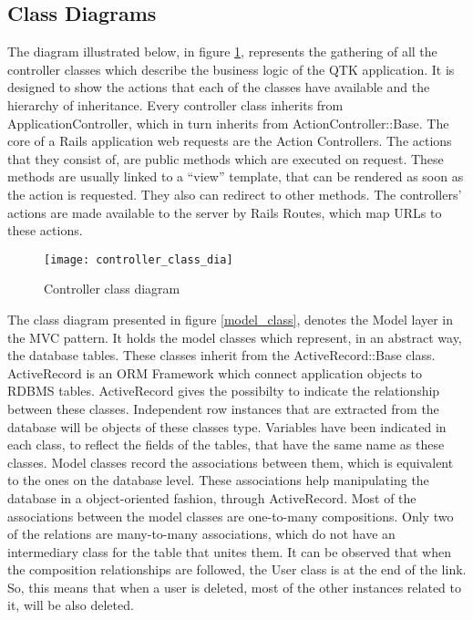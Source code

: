 \subsection{Class Diagrams}

The diagram illustrated below, in figure \ref{controller_class}, represents the gathering of all the controller classes which describe the business logic of the QTK application. It is designed to show the actions that each of the classes have available and the hierarchy of inheritance. Every controller class inherits from ApplicationController, which in turn inherits from ActionController::Base. The core of a Rails application web requests are the Action Controllers. The actions that they consist of, are public methods which are executed on request. These methods are usually linked to a ``view'' template, that can be rendered as soon as the action is requested. They also can redirect to other methods. The controllers' actions are made available to the server by Rails Routes, which map URLs to these actions. 

\begin{figure}[!ht]
\centering
\texttt{[image: controller\_class\_dia]}
\caption{Controller class diagram}\label{controller_class}
\end{figure}

The class diagram presented in figure \ref{model_class}, denotes the Model layer in the MVC pattern. It holds the model classes which represent, in an abstract way, the database tables. These classes inherit from the ActiveRecord::Base class. ActiveRecord is an ORM Framework which connect application objects to RDBMS tables. ActiveRecord gives the possibilty to indicate the relationship between these classes. Independent row instances that are extracted from the database will be objects of these classes type. Variables have been indicated in each class, to reflect the fields of the tables, that have the same name as these classes. Model classes record the associations between them, which is equivalent to the ones on the database level. These associations help manipulating the database in a object-oriented fashion, through ActiveRecord. Most of the associations between the model classes are one-to-many compositions. Only two of the relations are many-to-many associations, which do not have an intermediary class for the table that unites them. It can be observed that when the composition relationships are followed, the User class is at the end of the link. So, this means that when a user is deleted, most of the other instances related to it, will be also deleted. 

